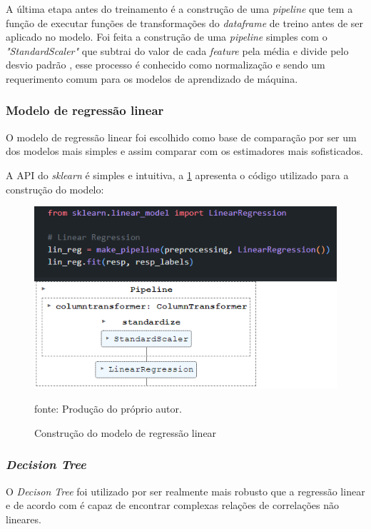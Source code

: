 \documentclass[
  12pt,		%
  a4paper,	%
  openright,%
  oneside,	%
  chapter=TITLE,		%
  section=TITLE,		%
  english,	%
  french,	%
  spanish,	%
  brazil	%
]{abntex2}
\begin{document}
    A última etapa antes do treinamento é a construção de uma \textit{pipeline} que tem a função de executar funções
    de transformações do \textit{dataframe} de treino antes de ser aplicado no modelo. Foi feita a construção de uma 
    \textit{pipeline} simples com o \textit{"StandardScaler"} que subtrai do valor de cada \textit{feature} pela média e divide pelo desvio padrão
    , esse processo é conhecido como normalização e sendo um requerimento comum para os modelos de aprendizado de máquina.

    \subsubsection{Modelo de regressão linear}

    O modelo de regressão linear foi escolhido como base de comparação por ser um dos modelos mais simples e assim
    comparar com os estimadores mais sofisticados.

    A API do \textit{sklearn} é simples e intuitiva, a \ref*{lin_reg} apresenta o código utilizado para a construção do modelo:

    \begin{figure}[ht]
        \centering
        \caption{Construção do modelo de regressão linear}
        \includegraphics[width=12cm]{../reports/figures/linear_reg.png}
        \label{lin_reg}
        \par
        {\small fonte: Produção do próprio autor.}
    \end{figure}

    \subsubsection{\textit{Decision Tree}}
    
    O \textit{Decison Tree} foi utilizado por ser realmente mais robusto que a regressão linear e de acordo com \cite[]{hands_on_ml} é capaz de encontrar
    complexas relações de correlações não lineares.
\end{document}
